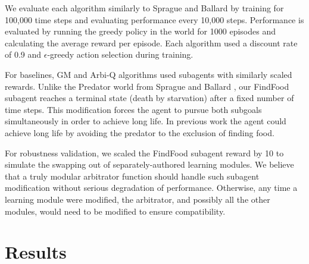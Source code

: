 We evaluate each algorithm similarly to Sprague and Ballard \cite{sprague2003multiple-goal} by training for 100,000 time steps and evaluating performance every 10,000 steps.  Performance is evaluated by running the greedy policy in the world for 1000 episodes and calculating the average reward per episode.  Each algorithm used a discount rate of 0.9 and $\epsilon$-greedy action selection during training.

For baselines, GM and Arbi-Q algorithms used subagents with similarly scaled rewards.  Unlike the Predator world from Sprague and Ballard \cite{sprague2003multiple-goal}, our FindFood subagent reaches a terminal state (death by starvation) after a fixed number of time steps.  This modification forces the agent to pursue both subgoals simultaneously in order to achieve long life.  In previous work the agent could achieve long life by avoiding the predator to the exclusion of finding food.

For robustness validation, we scaled the FindFood subagent reward by 10 to simulate the swapping out of separately-authored learning modules.  We believe that a truly modular arbitrator function should handle such subagent modification without serious degradation of performance.  Otherwise, any time a learning module were modified, the arbitrator, and possibly all the other modules, would need to be modified to ensure compatibility.

\section{Results}

